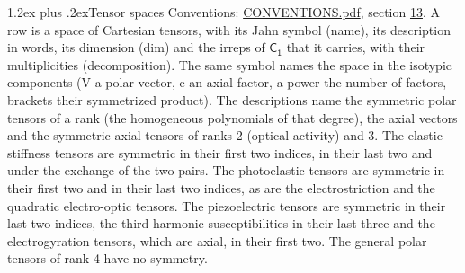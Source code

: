 \documentclass[10pt,a4paper]{article}
\makeatletter
\renewcommand\section{\@startsection{section}{1}{\z@}{-3ex plus -1ex minus -.2ex}%
  {1.2ex plus .2ex}{\normalfont\large\sffamily\bfseries\color{parttitle}}}
\numberwithin{equation}{section}
\newcommand{\grp}[1]{\mathsf{#1}}
\makeatother
\begin{document}
\section{Tensor spaces}\label{s:tensor_spaces}
Conventions: \href{../../CONVENTIONS.pdf}{CONVENTIONS.pdf}, section \href{../../CONVENTIONS.pdf\#conv.13}{13}.
\leavevmode\label{n:head.name}\label{n:head.description}\label{n:head.dim}\label{n:head.decomposition}A row is a space of Cartesian tensors, with its Jahn symbol (name), its description in words, its dimension (dim) and the irreps of $\grp{C_{1}}$ that it carries, with their multiplicities (decomposition). \label{n:label.jahn}The same symbol names the space in the isotypic components (V a polar vector, e an axial factor, a power the number of factors, brackets their symmetrized product). The descriptions name the symmetric polar tensors of a rank (the homogeneous polynomials of that degree), the axial vectors and the symmetric axial tensors of ranks 2 (optical activity) and 3. The elastic stiffness tensors are symmetric in their first two indices, in their last two and under the exchange of the two pairs. The photoelastic tensors are symmetric in their first two and in their last two indices, as are the electrostriction and the quadratic electro-optic tensors. The piezoelectric tensors are symmetric in their last two indices, the third-harmonic susceptibilities in their last three and the electrogyration tensors, which are axial, in their first two. The general polar tensors of rank 4 have no symmetry.
\end{document}
